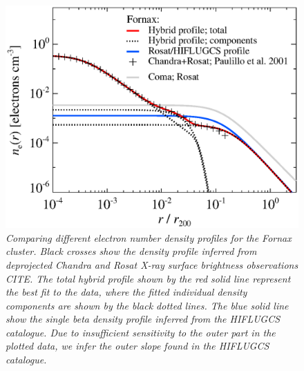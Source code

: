 \documentclass[10pt,aps,pra,reprint,amsmath,amsfonts,amssymb,showpacs]{revtex4-1}
\begin{document}
\begin{figure}%
 \includegraphics[width=0.99\columnwidth]{figures/dens.fornax.eps}
\caption{\it Comparing different electron number density profiles for
  the Fornax cluster. Black crosses show the density profile inferred
  from deprojected Chandra and Rosat X-ray surface brightness
  observations CITE. The total hybrid profile shown by the red solid
  line represent the best fit to the data, where the fitted individual
  density components are shown by the black dotted lines. The blue
  solid line show the single beta density profile inferred from the
  HIFLUGCS catalogue. Due to insufficient sensitivity to the outer part
  in the plotted data, we infer the outer slope found in the HIFLUGCS
  catalogue.}
 \label{fig18}
\end{figure}
\end{document}
